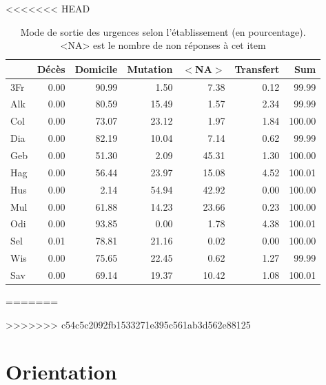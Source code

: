 \documentclass[12pt,english,french,twoside]{book}\usepackage[]{graphicx}\usepackage[]{color}
\makeatletter
\newenvironment{kframe}{%
 \def\at@end@of@kframe{}%
 \ifinner\ifhmode%
  \def\at@end@of@kframe{\end{minipage}}%
  \begin{minipage}{\columnwidth}%
 \fi\fi%
 \def\FrameCommand##1{\hskip\@totalleftmargin \hskip-\fboxsep
 \colorbox{shadecolor}{##1}\hskip-\fboxsep
     \hskip-\linewidth \hskip-\@totalleftmargin \hskip\columnwidth}%
 \MakeFramed {\advance\hsize-\width
   \@totalleftmargin\z@ \linewidth\hsize
   \@setminipage}}%
 {\par\unskip\endMakeFramed%
 \at@end@of@kframe}
\makeatother
\begin{document}
<<<<<<< HEAD
\begin{table}[ht]
\centering
\begin{tabular}{|l|r|r|r|r|r|r|}
  \hline
 & Décès & Domicile & Mutation & $<$NA$>$ & Transfert & Sum \\ 
  \hline
3Fr & 0.00 & 90.99 & 1.50 & 7.38 & 0.12 & 99.99 \\ 
  Alk & 0.00 & 80.59 & 15.49 & 1.57 & 2.34 & 99.99 \\ 
  Col & 0.00 & 73.07 & 23.12 & 1.97 & 1.84 & 100.00 \\ 
  Dia & 0.00 & 82.19 & 10.04 & 7.14 & 0.62 & 99.99 \\ 
  Geb & 0.00 & 51.30 & 2.09 & 45.31 & 1.30 & 100.00 \\ 
  Hag & 0.00 & 56.44 & 23.97 & 15.08 & 4.52 & 100.01 \\ 
  Hus & 0.00 & 2.14 & 54.94 & 42.92 & 0.00 & 100.00 \\ 
  Mul & 0.00 & 61.88 & 14.23 & 23.66 & 0.23 & 100.00 \\ 
  Odi & 0.00 & 93.85 & 0.00 & 1.78 & 4.38 & 100.01 \\ 
  Sel & 0.01 & 78.81 & 21.16 & 0.02 & 0.00 & 100.00 \\ 
  Wis & 0.00 & 75.65 & 22.45 & 0.62 & 1.27 & 99.99 \\ 
  Sav & 0.00 & 69.14 & 19.37 & 10.42 & 1.08 & 100.01 \\ 
   \hline
\end{tabular}
\caption[Mode de sortie selon l'établissement]{Mode de sortie des urgences selon l'établissement (en pourcentage). <NA> est le nombre de non réponses à cet item} 
\label{tab.sortie_etab}
\end{table}
=======
\begin{kframe}

>>>>>>> c54c5c2092fb1533271e395c561ab3d562e88125

{\ttfamily\noindent\bfseries\color{errorcolor}{\#\# Error: all arguments must have the same length}}

{\ttfamily\noindent\bfseries\color{errorcolor}{\#\# Error: indice hors limites}}

{\ttfamily\noindent\bfseries{}}\end{kframe}



\section{Orientation}
\end{document}
